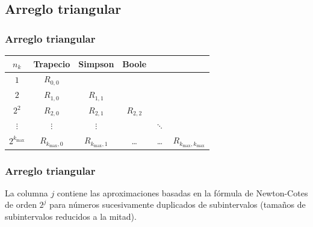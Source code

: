 \subsection*{Arreglo triangular}
\begin{frame}
\frametitle{Arreglo triangular}
\begin{table}
\centering
\begin{tabular}{c | c c c c c}
$n_{k}$ & Trapecio & Simpson & Boole & &  \\ \hline
$1$ & $R_{0, 0}$ & & & & \\
$2$ & $R_{1, 0}$ & $R_{1, 1}$ & & & \\
$2^{2}$ & $R_{2, 0}$ & $R_{2, 1}$ & $R_{2, 2}$& & \\
$\vdots$ & $\vdots$ & $\vdots$ &  & $\ddots$ & \\
$2^{k_{\max}}$ & $R_{k_{\max}, 0}$ & $R_{k_{\max}, 1}$ & \ldots & \ldots & $R_{k_{\max}, k_{\max}}$     
\end{tabular}
\end{table}
\end{frame}
\begin{frame}
\frametitle{Arreglo triangular}
La columna $j$ contiene las aproximaciones basadas en la fórmula de Newton-Cotes de orden $2^{j}$ para números sucesivamente duplicados de subintervalos (tamaños de subintervalos reducidos a la mitad).
\end{frame}
